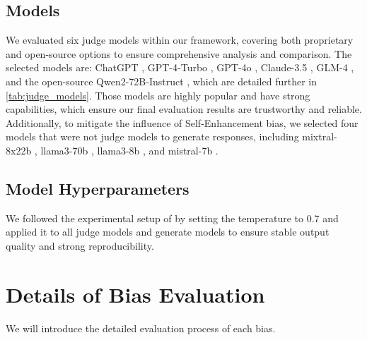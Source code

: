 \documentclass{article} %
\begin{document}
\subsection{Models}
We evaluated six judge models within our framework, covering both proprietary and open-source options to ensure comprehensive analysis and comparison. The selected models are: ChatGPT \citep{openai_gpt35_turbo}, GPT-4-Turbo \citep{openai2024gpt4report}, GPT-4o \citep{openai_hello_gpt4o}, Claude-3.5 \citep{anthropic_claude35}, GLM-4 \citep{glm2024chatglm}, and the open-source Qwen2-72B-Instruct \citep{qwen}, which are detailed further in \autoref{tab:judge_models}. 
Those models are highly popular and have strong capabilities, which ensure our final evaluation results are trustworthy and reliable. Additionally, to mitigate the influence of Self-Enhancement bias, we selected four models that were not judge models to generate responses, including mixtral-8x22b \citep{mistral2024mixtral}, llama3-70b \citep{llama3modelcard}, llama3-8b \citep{llama3modelcard}, and mistral-7b \citep{mistral2023mistral7b}.

\subsection{Model Hyperparameters}
We followed the experimental setup of \citet{chen2024mllmasajudgeassessingmultimodalllmasajudge} by setting the temperature to 0.7 and applied it to all judge models and generate models to ensure stable output quality and strong reproducibility.

\section{Details of Bias Evaluation}
\label{appendix:c}
We will introduce the detailed evaluation process of each bias.
\end{document}
